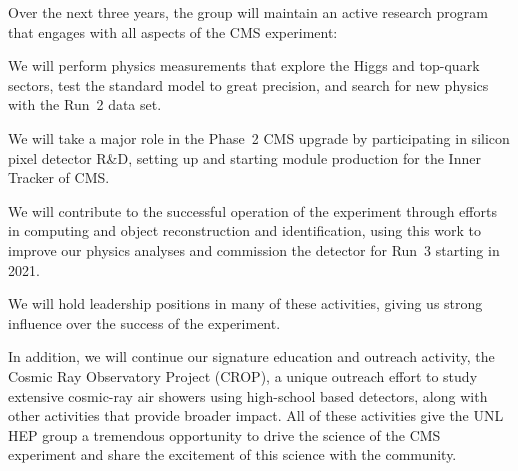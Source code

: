 Over the next three years, the group will maintain an active research program that engages with all aspects of the CMS experiment:

\begin{packed_enum}
\item We will perform physics measurements that explore the Higgs and top-quark sectors, test the standard model to great precision, and search for new physics with the Run~2 data set.
\item We will take a major role in the Phase~2 CMS upgrade by participating in silicon pixel detector R\&D, setting up and starting module production for the Inner Tracker of CMS.
\item We will contribute to the successful operation of the experiment through efforts in computing and object reconstruction and identification, using this work to improve our physics analyses and commission the detector for Run~3 starting in 2021.
\item We will hold leadership positions in many of these activities, giving us strong influence over the success of the experiment.
\end{packed_enum}

In addition, we will continue our signature education and outreach activity, the Cosmic Ray Observatory Project (CROP), a unique outreach effort to study extensive cosmic-ray air showers using high-school based detectors, along with other activities that provide broader impact.  All of these activities give the UNL HEP group a tremendous opportunity to drive the science of the CMS experiment and share the excitement of this science with the community.
